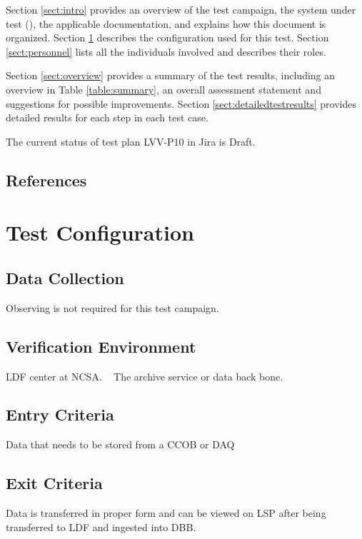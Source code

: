 \documentclass[DM,lsstdraft,STR,toc]{lsstdoc}
\begin{document}

Section \ref{sect:intro} provides an overview of the test campaign, the system under test (\product{}), the applicable documentation, and explains how this document is organized.
Section \ref{sect:configuration}  describes the configuration used for this test.
Section \ref{sect:personnel} lists all the individuals involved and describes their roles.

Section \ref{sect:overview} provides a summary of the test results, including an overview in Table \ref{table:summary}, an overall assessment statement and suggestions for possible improvements.
Section \ref{sect:detailedtestresults} provides detailed results for each step in each test case.

The current status of test plan LVV-P10 in Jira is Draft.

\subsection{References}
\label{sect:references}
\renewcommand{\refname}{}

\section{Test Configuration}
\label{sect:configuration}

\subsection{Data Collection}

  Observing is not required for this test campaign.

\subsection{Verification Environment}
\label{sect:hwconf}
  LDF center at NCSA. ~ The archive service or data back bone.~~


  \subsection{Entry Criteria}
  Data that needs to be stored from a CCOB or DAQ


  \subsection{Exit Criteria}
  Data is transferred in proper form and can be viewed on LSP after being
transferred to LDF and ingested into DBB.~~
\end{document}
